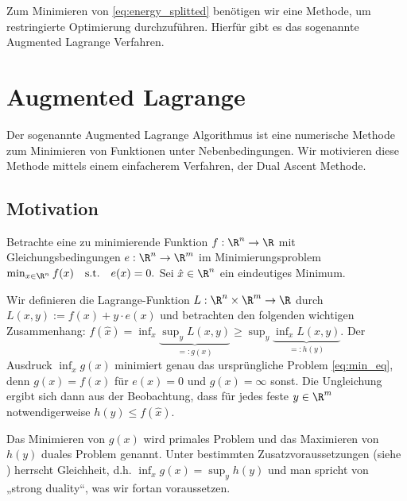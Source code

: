 \documentclass{mythesis}
\begin{document}
Zum Minimieren von \eqref{eq:energy_splitted} benötigen wir eine Methode, um restringierte Optimierung durchzuführen.
Hierfür gibt es das sogenannte Augmented Lagrange Verfahren.




\section{Augmented Lagrange} \label{section:augmented_lagrange}

Der sogenannte Augmented Lagrange Algorithmus ist eine numerische Methode zum Minimieren von Funktionen unter Nebenbedingungen.
Wir motivieren diese Methode mittels einem einfacherem Verfahren, der Dual Ascent Methode.

\subsection*{Motivation}

Betrachte eine zu minimierende Funktion $f: \R^n \to \R$ mit Gleichungsbedingungen $e: \R^n \to \R^m$ im Minimierungsproblem
\begin{math}[numbered] \label{eq:min_eq}
    \min_{x \in \R^n} f(x)
    \quad \mathrm{s.t.} \quad
    e(x) = 0.
\end{math}
Sei $\hat x \in \R^n$ ein eindeutiges Minimum.

Wir definieren die Lagrange-Funktion $L: \R^n \times \R^m \to \R$ durch
\begin{math}
    L(x,y) := f(x) + y \cdot e(x)
\end{math}
und betrachten den folgenden wichtigen Zusammenhang:
\begin{math}
    f(\hat x)
    =
    \inf_{x} \underbrace{\sup_{y} L(x,y)}_{=:g(x)}
    \ge
    \sup_{y} \underbrace{\inf_{x} L(x,y)}_{=:h(y)}.
\end{math}
Der Ausdruck $\inf_x g(x)$ minimiert genau das ursprüngliche Problem \eqref{eq:min_eq}, denn $g(x) = f(x)$ für $e(x) = 0$ und $g(x) = \infty$ sonst.
Die Ungleichung ergibt sich dann aus der Beobachtung, dass für jedes feste $y \in \R^m$ notwendigerweise $h(y) \le f(\hat x)$.

Das Minimieren von $g(x)$ wird primales Problem und das Maximieren von $h(y)$ duales Problem genannt.
Unter bestimmten Zusatzvoraussetzungen (siehe \cite[§5.2.3]{boyd2004convex}) herrscht Gleichheit, d.h. $\inf_x g(x) = \sup_y h(y)$ und man spricht von „strong duality“, was wir fortan voraussetzen.
\end{document}
